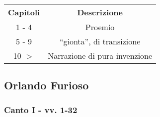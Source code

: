 \documentclass{article}
\begin{document}
\begin{tabular}{|c|c|}
\hline
Capitoli & Descrizione \\
\hline
1 - 4 & Proemio \\
5 - 9 & ``gionta'', di transizione \\
10 $>$ & Narrazione di pura invenzione \\
\hline
\end{tabular}

\subsection{Orlando Furioso}

\subsubsection{Canto I - vv. 1-32}
\end{document}
